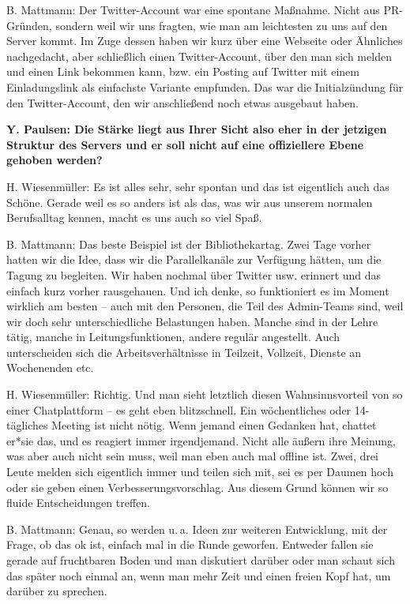 \documentclass[a4paper,
fontsize=11pt,
oneside,
numbers=noperiodatend,
parskip=half-,
bibliography=totoc,
final
]{scrartcl}
\begin{document}
B. Mattmann: Der Twitter-Account war eine spontane Maßnahme. Nicht aus
PR-Gründen, sondern weil wir uns fragten, wie man am leichtesten zu uns
auf den Server kommt. Im Zuge dessen haben wir kurz über eine Webseite
oder Ähnliches nachgedacht, aber schließlich einen Twitter-Account, über
den man sich melden und einen Link bekommen kann, bzw. ein Posting auf
Twitter mit einem Einladungslink als einfachste Variante empfunden. Das
war die Initialzündung für den Twitter-Account, den wir anschließend
noch etwas ausgebaut haben.

\textbf{Y. Paulsen: Die Stärke liegt aus Ihrer Sicht also eher in der
jetzigen Struktur des Servers und er soll nicht auf eine offiziellere
Ebene gehoben werden?}

H. Wiesenmüller: Es ist alles sehr, sehr spontan und das ist eigentlich
auch das Schöne. Gerade weil es so anders ist als das, was wir aus
unserem normalen Berufsalltag kennen, macht es uns auch so viel Spaß.

B. Mattmann: Das beste Beispiel ist der Bibliothekartag. Zwei Tage
vorher hatten wir die Idee, dass wir die Parallelkanäle zur Verfügung
hätten, um die Tagung zu begleiten. Wir haben nochmal über Twitter usw.
erinnert und das einfach kurz vorher rausgehauen. Und ich denke, so
funktioniert es im Moment wirklich am besten -- auch mit den Personen,
die Teil des Admin-Teams sind, weil wir doch sehr unterschiedliche
Belastungen haben. Manche sind in der Lehre tätig, manche in
Leitungsfunktionen, andere regulär angestellt. Auch unterscheiden sich
die Arbeitsverhältnisse in Teilzeit, Vollzeit, Dienste an Wochenenden
etc.

H. Wiesenmüller: Richtig. Und man sieht letztlich diesen
Wahnsinnsvorteil von so einer Chatplattform -- es geht eben
blitzschnell. Ein wöchentliches oder 14-tägliches Meeting ist nicht
nötig. Wenn jemand einen Gedanken hat, chattet er*sie das, und es
reagiert immer irgendjemand. Nicht alle äußern ihre Meinung, was aber
auch nicht sein muss, weil man eben auch mal offline ist. Zwei, drei
Leute melden sich eigentlich immer und teilen sich mit, sei es per
Daumen hoch oder sie geben einen Verbesserungsvorschlag. Aus diesem
Grund können wir so fluide Entscheidungen treffen.

B. Mattmann: Genau, so werden u. a. Ideen zur weiteren Entwicklung, mit
der Frage, ob das ok ist, einfach mal in die Runde geworfen. Entweder
fallen sie gerade auf fruchtbaren Boden und man diskutiert darüber oder
man schaut sich das später noch einmal an, wenn man mehr Zeit und einen
freien Kopf hat, um darüber zu sprechen.
\end{document}
